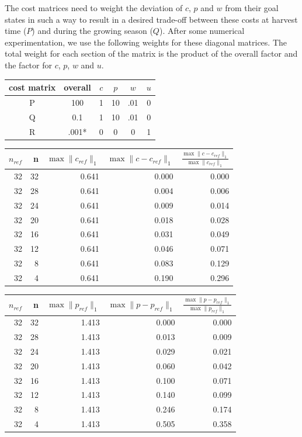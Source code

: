 \documentclass[11pt]{article}
\begin{document}
The cost matrices need to weight the deviation of $c$, $p$ and $w$ from their goal states in such a way to result in a desired trade-off between these costs at harvest time ($P$) and during the growing season ($Q$). After some numerical experimentation, we use the following weights for these diagonal matrices. The total weight for each section of the matrix is the product of the overall factor and the factor for $c$, $p$, $w$ and $u$.

\begin{center}
	\begin{tabular}{ | c | c | c | c | c | c | }
	\hline
    cost matrix & overall & $c$ & $p$ & $w$ & $u$ \\
    \hline
    P & 100 & 1 & 10 & .01 & 0 \\
    \hline
    Q & 0.1 & 1 & 10 & .01 & 0 \\
    \hline
    R & .001* & 0 & 0 & 0 & 1 \\
    \hline
    \end{tabular}
\end{center}

\begin{center}
	\begin{tabular}{rrrrr}
	\toprule
	$n_{ref}$ & n & $\max \| c_{ref} \|_1$ & $\max \| c-c_{ref} \|_1$ & $\frac{\max \| c-c_{ref} \|_1}{\max \| c_{ref} \|_1}$ \\
	\midrule
	32 & 32 & 0.641 & 0.000 & 0.000 \\
	32 & 28 & 0.641 & 0.004 & 0.006 \\
	32 & 24 & 0.641 & 0.009 & 0.014 \\
	32 & 20 & 0.641 & 0.018 & 0.028 \\
	32 & 16 & 0.641 & 0.031 & 0.049 \\
	32 & 12 & 0.641 & 0.046 & 0.071 \\
	32 & 8 & 0.641 & 0.083 & 0.129 \\
	32 & 4 & 0.641 & 0.190 & 0.296 \\
	\bottomrule
	\end{tabular}
\end{center}

\begin{center}
	\begin{tabular}{rrrrr}
	\toprule
	$n_{ref}$ & n & $\max \| p_{ref} \|_1$ & $\max \| p-p_{ref} \|_1$ & $\frac{\max \| p-p_{ref} \|_1}{\max \| p_{ref} \|_1}$ \\
	\midrule
	32 & 32 & 1.413 & 0.000 & 0.000 \\
	32 & 28 & 1.413 & 0.013 & 0.009 \\
	32 & 24 & 1.413 & 0.029 & 0.021 \\
	32 & 20 & 1.413 & 0.060 & 0.042 \\
	32 & 16 & 1.413 & 0.100 & 0.071 \\
	32 & 12 & 1.413 & 0.140 & 0.099 \\
	32 & 8 & 1.413 & 0.246 & 0.174 \\
	32 & 4 & 1.413 & 0.505 & 0.358 \\
	\bottomrule
	\end{tabular}
\end{center}
\end{document}
